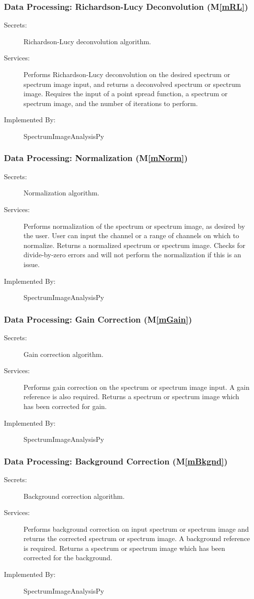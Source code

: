 \documentclass[12pt, titlepage]{article}
\newcommand{\mref}[1]{M\ref{#1}}
\newcommand{\progname}{SpectrumImageAnalysisPy}
\begin{document}
\subsubsection{Data Processing: Richardson-Lucy Deconvolution (\mref{mRL})}
\begin{description}
	\item[Secrets:]Richardson-Lucy deconvolution algorithm.
	\item[Services:]Performs Richardson-Lucy deconvolution on the desired spectrum
or spectrum image input, and returns a deconvolved spectrum or spectrum image.
Requires the input of a point spread function, a spectrum or spectrum image, and
the number of iterations to perform.
	\item[Implemented By:] \progname
\end{description}

\subsubsection{Data Processing: Normalization (\mref{mNorm})}
\begin{description}
	\item[Secrets:]Normalization algorithm.
	\item[Services:]Performs normalization of the spectrum or spectrum image, as
desired by the user. User can input the channel or a range of channels on which
to normalize. Returns a normalized spectrum or spectrum image. Checks for
divide-by-zero errors and will not perform the normalization if this is an
issue.
	\item[Implemented By:] \progname
\end{description}

\subsubsection{Data Processing: Gain Correction (\mref{mGain})}
\begin{description}
	\item[Secrets:]Gain correction algorithm.
	\item[Services:]Performs gain correction on the spectrum or spectrum image
input. A gain reference is also required. Returns a spectrum or spectrum image
which has been corrected for gain.
	\item[Implemented By:] \progname
\end{description}

\subsubsection{Data Processing: Background Correction (\mref{mBkgnd})}
\begin{description}
	\item[Secrets:]Background correction algorithm.
	\item[Services:]Performs background correction on input spectrum or spectrum
image and returns the corrected spectrum or spectrum image. A background
reference is required. Returns a spectrum or spectrum image which has been
corrected for the background.
	\item[Implemented By:] \progname
\end{description}
\end{document}
